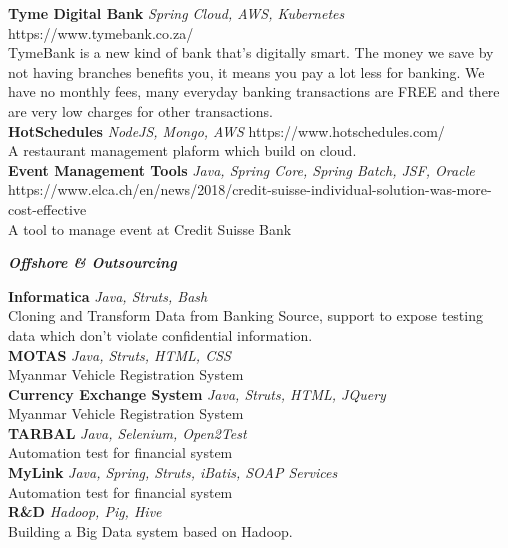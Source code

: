 \documentclass[a4paper]{article}
\begin{document}
{\textbf{Tyme Digital Bank}} {\sl Spring Cloud, AWS, Kubernetes} \hfill https://www.tymebank.co.za/\\
TymeBank is a new kind of bank that’s digitally smart. The money we save by not having branches benefits you, it means you pay a lot less for banking. We have no monthly fees, many everyday banking transactions are FREE and there are very low charges for other transactions.\\
\vspace*{2mm}
{\textbf{HotSchedules}} {\sl NodeJS, Mongo, AWS} \hfill https://www.hotschedules.com/\\
A restaurant management plaform which build on cloud.\\
\vspace*{2mm}
{\textbf{Event Management Tools}} {\sl Java, Spring Core, Spring Batch, JSF, Oracle} \hfill https://www.elca.ch/en/news/2018/credit-suisse-individual-solution-was-more-cost-effective\\
A tool to manage event at Credit Suisse Bank\\
\vspace*{2mm}

\begin{center}
	\textbf{\textit{Offshore \& Outsourcing}}
\end{center}

{\textbf{Informatica}} {\sl Java, Struts, Bash}\\
Cloning and Transform Data from Banking Source, support to expose testing data which don't violate confidential information.\\
\vspace*{2mm}
{\textbf{MOTAS}} {\sl Java, Struts, HTML, CSS}\\
Myanmar Vehicle Registration System\\
\vspace*{2mm}
{\textbf{Currency Exchange System}} {\sl Java, Struts, HTML, JQuery}\\
Myanmar Vehicle Registration System\\
\vspace*{2mm}
{\textbf{TARBAL}} {\sl Java, Selenium, Open2Test}\\
Automation test for financial system\\
\vspace*{2mm}
{\textbf{MyLink}} {\sl Java, Spring, Struts, iBatis, SOAP Services}\\
Automation test for financial system\\
\vspace*{2mm}
{\textbf{R\&D}} {\sl Hadoop, Pig, Hive}\\
Building a Big Data system based on Hadoop.\\
\vspace*{2mm}
\end{document}
